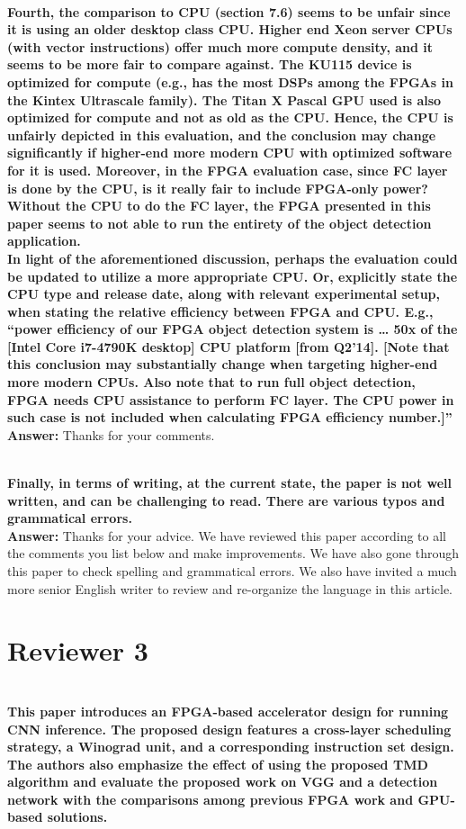 \documentclass[12pt]{paper}
\newcommand{\rev}[1]{{{\color[rgb]{0,0,1}{#1}}}}
\newcommand{\reviewer}[1]{\section*{Reviewer #1}}
\newcommand{\answer}[1]{\noindent\textbf{Answer:} #1}
\newcommand{\comment}[1]{\noindent\textbf{\\ #1}\\}
\begin{document}
\comment{Fourth, the comparison to CPU (section 7.6) seems to be unfair since it is using an older desktop class CPU. Higher end Xeon server CPUs (with vector instructions) offer much more compute density, and it seems to be more fair to compare against. The KU115 device is optimized for compute (e.g., has the most DSPs among the FPGAs in the Kintex Ultrascale family). The Titan X Pascal GPU used is also optimized for compute and not as old as the CPU. Hence, the CPU is unfairly depicted in this evaluation, and the conclusion may change significantly if higher-end more modern CPU with optimized software for it is used. Moreover, in the FPGA evaluation case, since FC layer is done by the CPU, is it really fair to include FPGA-only power? Without the CPU to do the FC layer, the FPGA presented in this paper seems to not able to run the entirety of the object detection application. \\
In light of the aforementioned discussion, perhaps the evaluation could be updated to utilize a more appropriate CPU. Or, explicitly state the CPU type and release date, along with relevant experimental setup, when stating the relative efficiency between FPGA and CPU. E.g., “power efficiency of our FPGA object detection system is … 50x of the [Intel Core i7-4790K desktop] CPU platform [from Q2’14]. [Note that this conclusion may substantially change when targeting higher-end more modern CPUs. Also note that to run full object detection, FPGA needs CPU assistance to perform FC layer. The CPU power in such case is not included when calculating FPGA efficiency number.]” 
}
\answer{Thanks for your comments.}
\rev{We have corrected this error.}

\comment{Finally, in terms of writing, at the current state, the paper is not well written, and can be challenging to read. There are various typos and grammatical errors. 
}
\answer{Thanks for your advice. We have reviewed this paper according to all the comments you list below and make improvements. We have also gone through this paper to check spelling and grammatical errors. We also have invited a much more senior English writer to review and re-organize the language in this article.\\}

\reviewer{3}

\comment{This paper introduces an FPGA-based accelerator design for running CNN inference. The proposed design features a cross-layer scheduling strategy, a Winograd unit, and a corresponding instruction set design. The authors also emphasize the effect of using the proposed TMD algorithm and evaluate the proposed work on VGG and a detection network with the comparisons among previous FPGA work and GPU-based solutions.  
}
\end{document}
